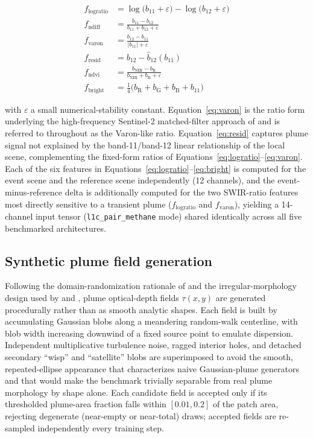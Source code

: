\documentclass[10pt,twocolumn]{article}
\begin{document}
\begin{align}
f_{\text{logratio}} &= \log\!\big(b_{11} + \varepsilon\big) - \log\!\big(b_{12} + \varepsilon\big) \label{eq:logratio}\\
f_{\text{ndiff}} &= \frac{b_{11} - b_{12}}{b_{11} + b_{12} + \varepsilon} \label{eq:ndiff}\\
f_{\text{varon}} &= \frac{b_{12} - b_{11}}{\lvert b_{11} \rvert + \varepsilon} \label{eq:varon}\\
f_{\text{resid}} &= b_{12} - \hat b_{12}(b_{11}) \label{eq:resid}\\
f_{\text{ndvi}} &= \frac{b_{\mathrm{NIR}} - b_{\mathrm{R}}}{b_{\mathrm{NIR}} + b_{\mathrm{R}} + \varepsilon} \label{eq:ndvi}\\
f_{\text{bright}} &= \tfrac{1}{4}\big(b_{\mathrm{R}} + b_{\mathrm{G}} + b_{\mathrm{B}} + b_{11}\big) \label{eq:bright}
\end{align}

with $\varepsilon$ a small numerical-stability constant. Equation~\eqref{eq:varon} is the ratio form underlying the high-frequency Sentinel-2 matched-filter approach of \citet{varon2021highfrequency} and is referred to throughout as the Varon-like ratio. Equation~\eqref{eq:resid} captures plume signal not explained by the band-11/band-12 linear relationship of the local scene, complementing the fixed-form ratios of Equations~\eqref{eq:logratio}--\eqref{eq:varon}. Each of the six features in Equations~\eqref{eq:logratio}--\eqref{eq:bright} is computed for the event scene and the reference scene independently (12 channels), and the event-minus-reference delta is additionally computed for the two SWIR-ratio features most directly sensitive to a transient plume ($f_{\text{logratio}}$ and $f_{\text{varon}}$), yielding a 14-channel input tensor (\texttt{l1c\_pair\_methane} mode) shared identically across all five benchmarked architectures.

\subsection{Synthetic plume field generation}
\label{sec:plumegen}

Following the domain-randomization rationale of \citet{tobin2017domain} and the irregular-morphology design used by \citet{rodriguezcuenca2023synthetic} and \citet{joyce2023deep}, plume optical-depth fields $\tau(x,y)$ are generated procedurally rather than as smooth analytic shapes. Each field is built by accumulating Gaussian blobs along a meandering random-walk centerline, with blob width increasing downwind of a fixed source point to emulate dispersion. Independent multiplicative turbulence noise, ragged interior holes, and detached secondary ``wisp'' and ``satellite'' blobs are superimposed to avoid the smooth, repeated-ellipse appearance that characterizes naive Gaussian-plume generators and that would make the benchmark trivially separable from real plume morphology by shape alone. Each candidate field is accepted only if its thresholded plume-area fraction falls within $[0.01, 0.2]$ of the patch area, rejecting degenerate (near-empty or near-total) draws; accepted fields are re-sampled independently every training step.
\end{document}
